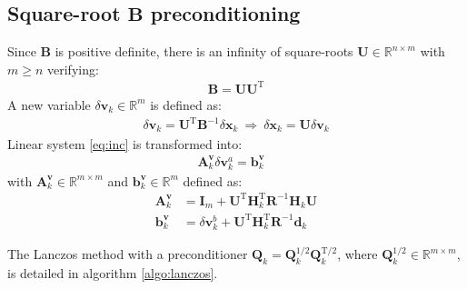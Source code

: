 \documentclass[12pt]{scrartcl}
\begin{document}
\FloatBarrier

\subsection{Square-root $\mathbf{B}$ preconditioning}
Since $\mathbf{B}$ is positive definite, there is an infinity of square-roots $\mathbf{U} \in \mathbb{R}^{n \times m}$ with $m \ge n$ verifying:
\begin{align}
\mathbf{B} = \mathbf{U} \mathbf{U}^\mathrm{T}
\end{align}
A new variable $\delta \mathbf{v}_k \in \mathbb{R}^m$ is defined as:
\begin{align}
\delta \mathbf{v}_k = \mathbf{U}^\mathrm{T} \mathbf{B}^{-1} \delta \mathbf{x}_k \ \Rightarrow \ \delta \mathbf{x}_k = \mathbf{U} \delta \mathbf{v}_k
\end{align}
Linear system \eqref{eq:inc} is transformed into:
\begin{align}
\label{eq:inc_U}
\mathbf{A}^\mathbf{v}_k \delta \mathbf{v}^a_k = \mathbf{b}^\mathbf{v}_k &
\end{align}
with $\mathbf{A}^\mathbf{v}_k \in \mathbb{R}^{m \times m}$ and $\mathbf{b}^\mathbf{v}_k \in \mathbb{R}^{m}$ defined as:
\begin{align}
\mathbf{A}^\mathbf{v}_k & = \mathbf{I}_m + \mathbf{U}^\mathrm{T} \mathbf{H}_k^\mathrm{T} \mathbf{R}^{-1} \mathbf{H}_k \mathbf{U} \\
\mathbf{b}^\mathbf{v}_k & = \delta \mathbf{v}^b_k + \mathbf{U}^\mathrm{T} \mathbf{H}_k^\mathrm{T} \mathbf{R}^{-1} \mathbf{d}_k
\end{align}

The Lanczos method with a preconditioner $\mathbf{Q}_k = \mathbf{Q}_k^{1/2} \mathbf{Q}_k^{\mathrm{T}/2}$, where $\mathbf{Q}_k^{1/2} \in \mathbb{R}^{m \times m}$, is detailed in algorithm \ref{algo:lanczos}.\\
\end{document}
